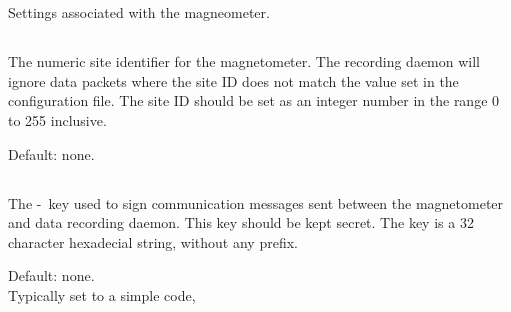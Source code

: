 
\section{\code{[magnetometer]}}

Settings associated with the magneometer.

\subsection{}

The numeric site identifier for the magnetometer. The recording daemon
will ignore data packets where the site ID does not match the value
set in the configuration file. The site ID should be set as an integer
number in the range 0 to 255 inclusive.

Default: none.

\subsection{}
The \hmac-\mdfive\ key used to sign communication messages sent between
the magnetometer and data recording daemon. This key should be kept
secret. The key is a 32 character hexadecial string, without any
 prefix.

Default: none.\\
Typically set to a simple code, 


